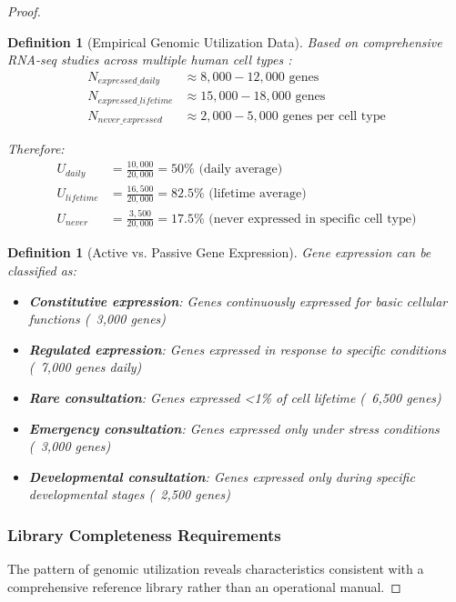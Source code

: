 \documentclass[12pt,a4paper]{article}
\newtheorem{definition}[theorem]{Definition}
\begin{document}
\begin{proof}
\begin{definition}[Empirical Genomic Utilization Data]
Based on comprehensive RNA-seq studies across multiple human cell types \cite{encode2012integrated}:
\begin{align}
N_{expressed\_daily} &\approx 8,000-12,000 \text{ genes} \\
N_{expressed\_lifetime} &\approx 15,000-18,000 \text{ genes} \\
N_{never\_expressed} &\approx 2,000-5,000 \text{ genes per cell type}
\end{align}

Therefore:
\begin{align}
U_{daily} &= \frac{10,000}{20,000} = 50\% \text{ (daily average)} \\
U_{lifetime} &= \frac{16,500}{20,000} = 82.5\% \text{ (lifetime average)} \\
U_{never} &= \frac{3,500}{20,000} = 17.5\% \text{ (never expressed in specific cell type)}
\end{align}
\end{definition}

\begin{definition}[Active vs. Passive Gene Expression]
Gene expression can be classified as:
\begin{itemize}
\item \textbf{Constitutive expression}: Genes continuously expressed for basic cellular functions (~3,000 genes)
\item \textbf{Regulated expression}: Genes expressed in response to specific conditions (~7,000 genes daily)
\item \textbf{Rare consultation}: Genes expressed <1\% of cell lifetime (~6,500 genes)
\item \textbf{Emergency consultation}: Genes expressed only under stress conditions (~3,000 genes)
\item \textbf{Developmental consultation}: Genes expressed only during specific developmental stages (~2,500 genes)
\end{itemize}
\end{definition}

\subsubsection{Library Completeness Requirements}

The pattern of genomic utilization reveals characteristics consistent with a comprehensive reference library rather than an operational manual.


\end{proof}
\end{document}
